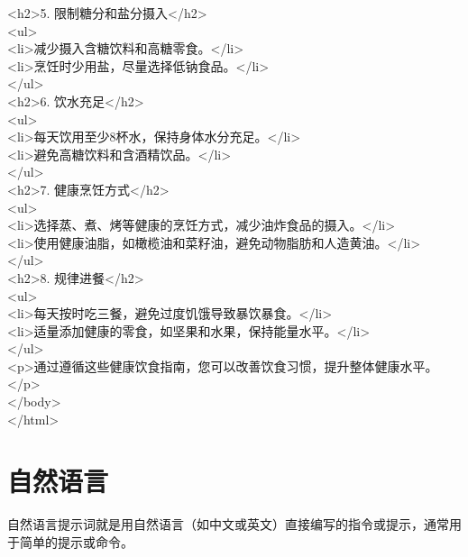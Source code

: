 \documentclass[12pt]{book}
\begin{document}
\begin{tcolorbox}
<h2>5. 限制糖分和盐分摄入</h2>\\
<ul>\\
<li>减少摄入含糖饮料和高糖零食。</li>\\
<li>烹饪时少用盐，尽量选择低钠食品。</li>\\
</ul>\\

<h2>6. 饮水充足</h2>\\
<ul>\\
<li>每天饮用至少8杯水，保持身体水分充足。</li>\\
<li>避免高糖饮料和含酒精饮品。</li>\\
</ul>\\

<h2>7. 健康烹饪方式</h2>\\
<ul>\\
<li>选择蒸、煮、烤等健康的烹饪方式，减少油炸食品的摄入。</li>\\
<li>使用健康油脂，如橄榄油和菜籽油，避免动物脂肪和人造黄油。</li>\\
</ul>\\

<h2>8. 规律进餐</h2>\\
<ul>\\
<li>每天按时吃三餐，避免过度饥饿导致暴饮暴食。</li>\\
<li>适量添加健康的零食，如坚果和水果，保持能量水平。</li>\\
</ul>\\

<p>通过遵循这些健康饮食指南，您可以改善饮食习惯，提升整体健康水平。</p>\\
</body>\\
</html>\\

\end{tcolorbox}	


\section{自然语言}

自然语言提示词就是用自然语言（如中文或英文）直接编写的指令或提示，通常用于简单的提示或命令。
\end{document}
